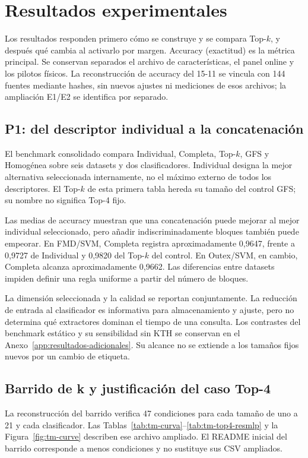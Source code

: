 \chapter{Resultados experimentales}\label{sec:resultados-experimentales}

Los resultados responden primero cómo se construye y se compara Top-\(k\), y después qué cambia al activarlo por margen. Accuracy (exactitud) es la métrica principal. Se conservan separados el archivo de características, el panel online y los pilotos físicos. La reconstrucción de accuracy del 15-11 se vincula con 144 fuentes mediante hashes, sin nuevos ajustes ni mediciones de esos archivos; la ampliación E1/E2 se identifica por separado.

\section{P1: del descriptor individual a la concatenación}\label{sec:resultados-fase1}
El benchmark consolidado compara Individual, Completa, Top-\(k\), GFS y Homogénea sobre seis datasets y dos clasificadores. Individual designa la mejor alternativa seleccionada internamente, no el máximo externo de todos los descriptores. El Top-\(k\) de esta primera tabla hereda su tamaño del control GFS; su nombre no significa Top-4 fijo.




Las medias de accuracy muestran que una concatenación puede mejorar al mejor individual seleccionado, pero añadir indiscriminadamente bloques también puede empeorar. En FMD/SVM, Completa registra aproximadamente 0,9647, frente a 0,9727 de Individual y 0,9820 del Top-\(k\) del control. En Outex/SVM, en cambio, Completa alcanza aproximadamente 0,9662. Las diferencias entre datasets impiden definir una regla uniforme a partir del número de bloques.

La dimensión seleccionada y la calidad se reportan conjuntamente. La reducción de entrada al clasificador es informativa para almacenamiento y ajuste, pero no determina qué extractores dominan el tiempo de una consulta. Los contrastes del benchmark estático y su sensibilidad sin KTH se conservan en el Anexo~\ref{app:resultados-adicionales}. Su alcance no se extiende a los tamaños fijos nuevos por un cambio de etiqueta.

\section{Barrido de k y justificación del caso Top-4}
La reconstrucción del barrido verifica 47 condiciones para cada tamaño de uno a 21 y cada clasificador. Las Tablas~\ref{tab:tm-curva}--\ref{tab:tm-top4-resmlp} y la Figura~\ref{fig:tm-curve} describen ese archivo ampliado. El README inicial del barrido corresponde a menos condiciones y no sustituye sus CSV ampliados.

